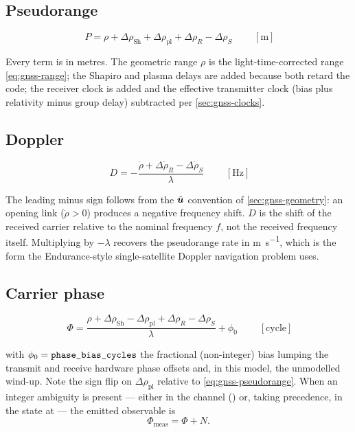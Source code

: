 \subsection{Pseudorange}

\begin{equation}
  \label{eq:gnss-pseudorange}
  \boxed{\;
  P = \rho
    + \Delta\rho_{\mathrm{Sh}}
    + \Delta\rho_{\mathrm{pl}}
    + \Delta\rho_R
    - \Delta\rho_S \;}
  \qquad [\si{\meter}]
\end{equation}

Every term is in metres. The geometric range $\rho$ is the light-time-corrected
range \cref{eq:gnss-range}; the Shapiro and plasma delays are added because
both retard the code; the receiver clock is added and the effective
transmitter clock (bias plus relativity minus group delay) subtracted per
\cref{sec:gnss-clocks}.

\subsection{Doppler}

\begin{equation}
  \label{eq:gnss-doppler}
  \boxed{\;
  D = -\frac{\dot\rho + \Delta\dot\rho_R - \Delta\dot\rho_S}{\lambda} \;}
  \qquad [\si{\hertz}]
\end{equation}

The leading minus sign follows from the $\hat{\bm{u}}$ convention of
\cref{sec:gnss-geometry}: an opening link ($\dot\rho > 0$) produces a negative
frequency shift. $D$ is the shift of the received carrier relative to the
nominal frequency $f$, not the received frequency itself. Multiplying by
$-\lambda$ recovers the pseudorange rate in \si{\meter\per\second}, which is
the form the Endurance-style single-satellite Doppler navigation problem uses.

\subsection{Carrier phase}

\begin{equation}
  \label{eq:gnss-carrier}
  \boxed{\;
  \Phi = \frac{\rho
    + \Delta\rho_{\mathrm{Sh}}
    - \Delta\rho_{\mathrm{pl}}
    + \Delta\rho_R
    - \Delta\rho_S}{\lambda}
    + \phi_0 \;}
  \qquad [\text{cycle}]
\end{equation}

with $\phi_0 = \texttt{phase\_bias\_cycles}$ the fractional (non-integer) bias
lumping the transmit and receive hardware phase offsets and, in this model,
the unmodelled wind-up. Note the sign flip on $\Delta\rho_{\mathrm{pl}}$
relative to \cref{eq:gnss-pseudorange}. When an integer ambiguity is present
--- either in the channel () or, taking
precedence, in the state at  --- the emitted
observable is
\begin{equation}
  \label{eq:gnss-carrier-meas}
  \Phi_{\mathrm{meas}} = \Phi + N .
\end{equation}

